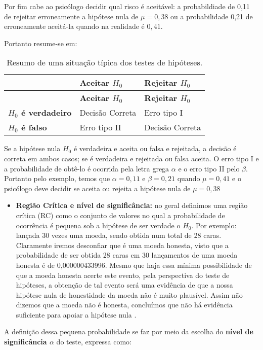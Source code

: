 \documentclass[
]{book}
\providecommand{\tightlist}{%
  \setlength{\itemsep}{0pt}\setlength{\parskip}{0pt}}
\begin{document}
Por fim cabe ao psicólogo decidir qual risco é aceitável: a probabildiade de 0,11 de rejeitar erroneamente a hipótese nula de \(\mu = 0,38\) ou a probabilidade 0,21 de erroneamente aceitá-la quando na realidade é \(0,41\).

Portanto resume-se em:

\begin{longtable}[]{@{}lll@{}}
\caption{\label{tab:tabelahipotese} Resumo de uma situação típica dos testes de hipóteses.}\tabularnewline
\toprule
& \textbf{Aceitar \(H_0\)} & \textbf{Rejeitar \(H_0\)}\tabularnewline
\midrule
\endfirsthead
\toprule
& \textbf{Aceitar \(H_0\)} & \textbf{Rejeitar \(H_0\)}\tabularnewline
\midrule
\endhead
\textbf{\(H_0\) é verdadeiro} & Decisão Correta & Erro tipo I\tabularnewline
\textbf{\(H_0\) é falso} & Erro tipo II & Decisão Correta\tabularnewline
\bottomrule
\end{longtable}

Se a hipótese nula \(H_0\) é verdadeira e aceita ou falsa e rejeitada, a decisão é correta em ambos casos; se é verdadeira e rejeitada ou falsa aceita. O erro tipo I e a probabilidade de obtê-lo é ocorrida pela letra grega \(\alpha\) e o erro tipo II pelo \(\beta\). Portanto pelo exemplo, temos que \(\alpha=0,11\) e \(\beta=0,21\) quando \(\mu=0,41\) e o psicólogo deve decidir se aceita ou rejeita a hipótese nula de \(\mu=0,38\)

\begin{itemize}
\tightlist
\item
  \textbf{Região Crítica e nível de significância:} no geral definimos uma região crítica (RC) como o conjunto de valores no qual a probabilidade de ocorrência é pequena sob a hipótese de ser verdade o \(H_0\). Por exemplo: lançada 30 vezes uma moeda, sendo obtida num total de 28 caras. Claramente iremos desconfiar que é uma moeda honesta, visto que a probabilidade de ser obtida 28 caras em 30 lançamentos de uma moeda honesta é de 0,000000433996. Mesmo que haja essa mínima possibilidade de que a moeda honesta acerte este evento, pela perspectiva do teste de hipóteses, a obtenção de tal evento será uma evidência de que a nossa hipótese nula de honestidade da moeda não é muito plausível. Assim não dizemos que a moeda não é honesta, concluímos que não há evidência suficiente para apoiar a hipótese nula \citep{fariaestatistic}.
\end{itemize}

A definição dessa pequena probabilidade se faz por meio da escolha do \textbf{nível de significância \(\alpha\)} do teste, expressa como:
\end{document}
